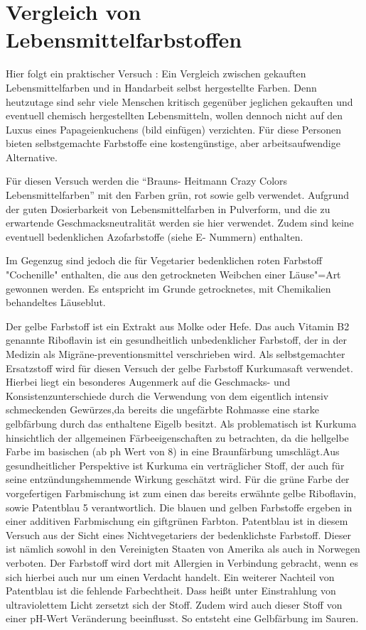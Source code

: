 \documentclass[11pt]{scrreprt}
\begin{document}
\chapter{Vergleich von Lebensmittelfarbstoffen}

 Hier folgt ein praktischer Versuch : Ein Vergleich zwischen gekauften Lebensmittelfarben und in Handarbeit selbst hergestellte Farben. Denn heutzutage sind sehr viele Menschen kritisch gegenüber jeglichen gekauften und eventuell chemisch hergestellten Lebensmitteln, wollen dennoch nicht auf den Luxus eines Papageienkuchens (bild einfügen) verzichten. Für diese Personen bieten selbstgemachte Farbstoffe eine kostengünstige, aber arbeitsaufwendige Alternative. 
 
 Für diesen  Versuch werden die \enquote{Brauns- Heitmann Crazy Colors Lebensmittelfarben} mit den Farben grün, rot sowie gelb verwendet. Aufgrund der guten Dosierbarkeit von Lebensmittelfarben in Pulverform, und die zu erwartende Geschmacksneutralität werden sie hier verwendet. Zudem sind keine eventuell bedenklichen Azofarbstoffe (siehe E- Nummern) enthalten. 
 
 Im Gegenzug sind jedoch die für Vegetarier bedenklichen roten Farbstoff "Cochenille" enthalten, die aus den getrockneten Weibchen einer Läuse"=Art gewonnen werden. Es entspricht im Grunde getrocknetes, mit Chemikalien behandeltes Läuseblut.
 
  Der gelbe Farbstoff ist ein Extrakt aus Molke oder Hefe. Das auch Vitamin B2 genannte Riboflavin ist ein gesundheitlich unbedenklicher Farbstoff, der in der Medizin als Migräne-preventionsmittel verschrieben wird. Als selbstgemachter Ersatzstoff wird für diesen Versuch der gelbe Farbstoff Kurkumasaft verwendet. Hierbei liegt ein besonderes Augenmerk auf die Geschmacks- und Konsistenzunterschiede durch die Verwendung von dem eigentlich intensiv schmeckenden Gewürzes,da bereits die ungefärbte Rohmasse eine starke gelbfärbung durch das enthaltene Eigelb besitzt. Als problematisch ist Kurkuma hinsichtlich der allgemeinen Färbeeigenschaften zu betrachten, da die hellgelbe Farbe im basischen (ab ph Wert von 8) in eine Braunfärbung umschlägt.Aus gesundheitlicher Perspektive ist Kurkuma ein verträglicher Stoff, der auch für seine entzündungshemmende Wirkung geschätzt wird.
  Für die grüne Farbe der vorgefertigen Farbmischung ist zum einen das bereits erwähnte gelbe Riboflavin, sowie Patentblau 5
  verantwortlich. Die blauen und gelben Farbstoffe ergeben in einer additiven Farbmischung ein giftgrünen Farbton. Patentblau ist in diesem Versuch aus der Sicht eines Nichtvegetariers der bedenklichste Farbstoff. Dieser ist nämlich sowohl in den Vereinigten Staaten von Amerika als auch in Norwegen verboten. Der Farbstoff wird dort mit Allergien in Verbindung gebracht, wenn es sich hierbei auch nur um einen Verdacht handelt. Ein weiterer Nachteil von Patentblau ist die fehlende Farbechtheit. Dass heißt unter Einstrahlung von ultraviolettem Licht zersetzt sich der Stoff. Zudem wird auch dieser Stoff von einer pH-Wert Veränderung beeinflusst. So entsteht eine Gelbfärbung im Sauren.
  
\end{document}
